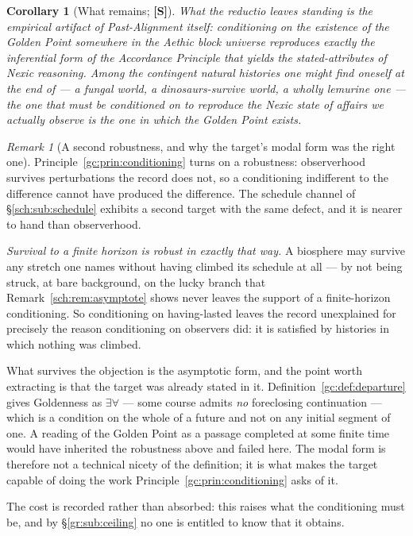 \documentclass[11pt]{article}
\numberwithin{equation}{section}
\theoremstyle{plain}
\newtheorem{corollary}[theorem]{Corollary}
\theoremstyle{definition}
\theoremstyle{remark}
\newtheorem{remark}[theorem]{Remark}
\begin{document}
\begin{corollary}[What remains; \textbf{[S]}]\label{gc:cor:remains}
What the reductio leaves standing is the empirical artifact of
Past-Alignment itself: conditioning on the existence of the Golden Point
somewhere in the Aethic block universe reproduces exactly the
inferential form of the Accordance Principle that yields the
stated-attributes of Nexic reasoning. Among the contingent natural
histories one might find oneself at the end of --- a fungal world, a
dinosaurs-survive world, a wholly lemurine one --- the one that must be
conditioned on to reproduce the Nexic state of affairs we actually
observe is the one in which the Golden Point exists.
\end{corollary}

\begin{remark}[A second robustness, and why the target's modal form was
the right one]\label{gc:rem:finitehorizon}
Principle~\ref{gc:prin:conditioning} turns on a robustness: observerhood
survives perturbations the record does not, so a conditioning
indifferent to the difference cannot have produced the difference. The
schedule channel of \S\ref{sch:sub:schedule} exhibits a second target
with the same defect, and it is nearer to hand than observerhood.

\emph{Survival to a finite horizon is robust in exactly that way.} A
biosphere may survive any stretch one names without having climbed its
schedule at all --- by not being struck, at bare background, on the
lucky branch that Remark~\ref{sch:rem:asymptote} shows never leaves the
support of a finite-horizon conditioning. So conditioning on
having-lasted leaves the record unexplained for precisely the reason
conditioning on observers did: it is satisfied by histories in which
nothing was climbed.

What survives the objection is the asymptotic form, and the point worth
extracting is that the target was already stated in it.
Definition~\ref{gc:def:departure} gives Goldenness as $\exists\forall$
--- some course admits \emph{no} foreclosing continuation --- which is a
condition on the whole of a future and not on any initial segment of
one. A reading of the Golden Point as a passage completed at some finite
time would have inherited the robustness above and failed here. The
modal form is therefore not a technical nicety of the definition; it is
what makes the target capable of doing the work
Principle~\ref{gc:prin:conditioning} asks of it.

The cost is recorded rather than absorbed: this raises what the
conditioning must be, and by \S\ref{gr:sub:ceiling} no one is entitled
to know that it obtains.
\end{remark}
\end{document}
